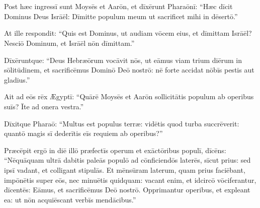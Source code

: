\chapter{}
\thispagestyle{empty}

Post hæc ingressī sunt Moysēs
et Aarōn, et dīxērunt Pharaōnī: ``Hæc dīcit Dominus Deus
Isrāēl: Dīmitte populum meum ut
sacrificet mihi in dēsertō.''

At ille respondit: ``Quis est
Dominus, ut audiam vōcem eius, et dīmittam Isrāēl? Nesciō
Dominum, et Isrāēl nōn dīmittam.''

Dīxēruntque: ``Deus
Hebræōrum vocāvit nōs, ut eāmus viam trium diērum in
sōlitūdinem, et
sacrificēmus Dominō Deō nostrō: nē forte accidat nōbīs
pestis aut
gladius.''

Ait ad eōs rēx Ægyptī: ``Quārē
Moysēs et Aarōn sollicitātis populum ab
operibus suīs? Īte ad onera vestra.''

Dīxitque
Pharaō: ``Multus est populus terræ: vidētis quod turba
succrēverit: quantō magis sī dederītis eīs
requiem ab operibus?'' 


Præcēpit ergō in diē illō
præfectīs operum et exāctōribus populī,
dīcēns:  ``Nēquā\-quam ultrā dabitis paleās
populō ad cōnficiendōs laterēs, sīcut prius: sed ipsī vadant, 
et colligant stipulās. 
Et mēnsūram laterum, quam prius faciēbant, impōnētis super eōs, nec
minuētis quidquam: vacant enim, et
idcircō vōciferantur, dīcentēs: Eāmus, et sacrificēmus
Deō nostrō.  Opprimantur operibus, et expleant ea: ut nōn
acquiēscant verbīs
mendācibus.''

